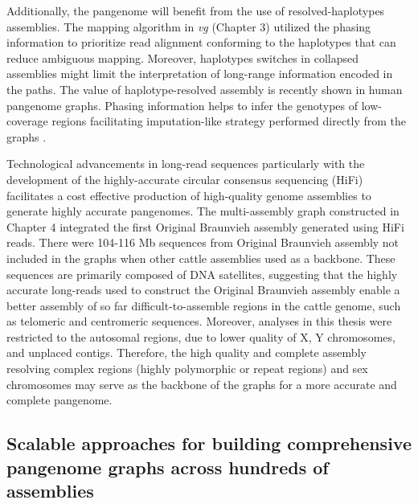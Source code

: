 \documentclass[../main.tex]{subfiles}
\begin{document}
Additionally, the pangenome will benefit from the use of resolved-haplotypes assemblies. The mapping algorithm in \emph{vg} (Chapter 3) utilized the phasing information to prioritize read alignment conforming to the haplotypes that can reduce ambiguous mapping. Moreover, haplotypes switches in collapsed assemblies might limit the interpretation of long-range information encoded in the paths. The value of haplotype-resolved assembly is recently shown in human pangenome graphs. Phasing information helps to infer the genotypes of low-coverage regions facilitating imputation-like strategy performed directly from the graphs \citep{ebler2020pangenome,ebert2021haplotype}. 

Technological advancements in long-read sequences particularly with the development of the highly-accurate circular consensus sequencing (HiFi) facilitates a cost effective production of high-quality genome assemblies to generate highly accurate pangenomes.  The multi-assembly graph constructed in Chapter 4 integrated the first Original Braunvieh assembly generated using HiFi reads. There were 104-116 Mb sequences from Original Braunvieh assembly not included in the graphs when other cattle assemblies used as a backbone. These sequences are primarily composed of DNA satellites, suggesting that the highly accurate long-reads used to construct the Original Braunvieh assembly enable a better assembly of so far difficult-to-assemble regions in the cattle genome, such as telomeric and centromeric sequences. Moreover, analyses in this thesis were restricted to the autosomal regions, due to lower quality of X, Y chromosomes, and unplaced contigs. Therefore, the high quality and complete assembly resolving complex regions (highly polymorphic or repeat regions) and sex chromosomes may serve as the backbone of the graphs \citep{logsdon2021structure,miga2020telomere} for a more accurate and complete pangenome.  

\subsection*{Scalable approaches for building comprehensive pangenome graphs across hundreds of assemblies }
\end{document}
